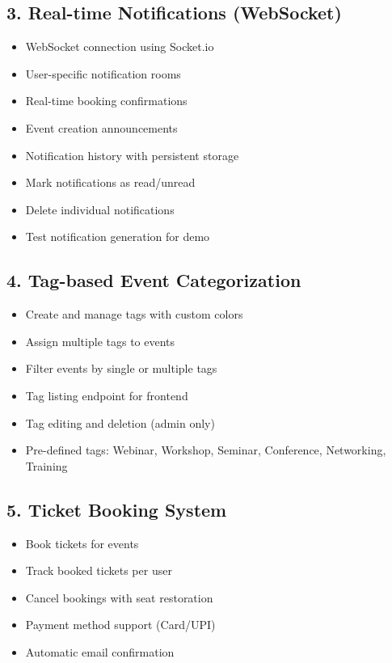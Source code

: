\documentclass[12pt]{report}
\begin{document}
\subsection{3. Real-time Notifications (WebSocket)}
\begin{itemize}
\item WebSocket connection using Socket.io
\item User-specific notification rooms
\item Real-time booking confirmations
\item Event creation announcements
\item Notification history with persistent storage
\item Mark notifications as read/unread
\item Delete individual notifications
\item Test notification generation for demo
\end{itemize}

\subsection{4. Tag-based Event Categorization}
\begin{itemize}
\item Create and manage tags with custom colors
\item Assign multiple tags to events
\item Filter events by single or multiple tags
\item Tag listing endpoint for frontend
\item Tag editing and deletion (admin only)
\item Pre-defined tags: Webinar, Workshop, Seminar, Conference, Networking, Training
\end{itemize}

\subsection{5. Ticket Booking System}
\begin{itemize}
\item Book tickets for events
\item Track booked tickets per user
\item Cancel bookings with seat restoration
\item Payment method support (Card/UPI)
\item Automatic email confirmation
\end{itemize}
\end{document}
